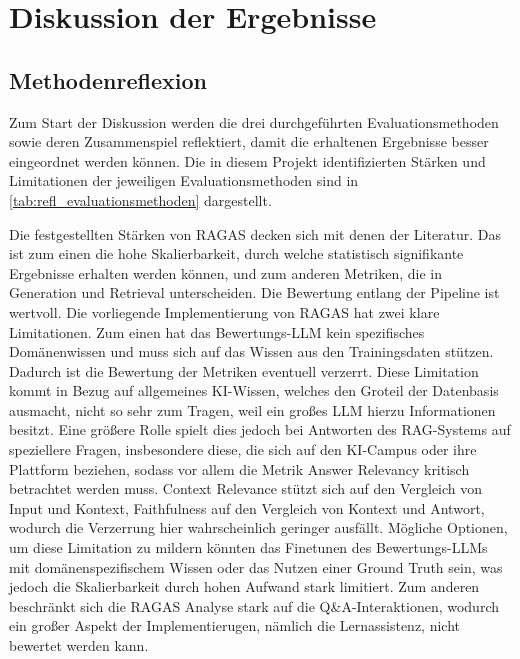 \chapter{Diskussion der Ergebnisse}
\label{sec:diskussion}
\section{Methodenreflexion}
\label{sec:methodrefl}
Zum Start der Diskussion werden die drei durchgeführten Evaluationsmethoden sowie deren Zusammenspiel reflektiert, damit die erhaltenen Ergebnisse besser eingeordnet werden können. Die in diesem Projekt identifizierten Stärken und Limitationen der jeweiligen Evaluationsmethoden sind in \autoref{tab:refl_evaluationsmethoden} dargestellt.

Die festgestellten Stärken von RAGAS decken sich mit denen der Literatur. Das ist zum einen die hohe Skalierbarkeit, durch welche statistisch signifikante Ergebnisse erhalten werden können, und zum anderen Metriken, die in Generation und Retrieval unterscheiden. Die Bewertung entlang der Pipeline ist wertvoll. Die vorliegende Implementierung von RAGAS hat zwei klare Limitationen. Zum einen hat das Bewertungs-LLM kein spezifisches Domänenwissen und muss sich auf das Wissen aus den Trainingsdaten stützen. Dadurch ist die Bewertung der Metriken eventuell verzerrt. Diese Limitation kommt in Bezug auf allgemeines KI-Wissen, welches den Groteil der Datenbasis ausmacht, nicht so sehr zum Tragen, weil ein großes LLM hierzu Informationen besitzt. Eine größere Rolle spielt dies jedoch bei Antworten des RAG-Systems auf speziellere Fragen, insbesondere diese, die sich auf den KI-Campus oder ihre Plattform beziehen, sodass vor allem die Metrik Answer Relevancy kritisch betrachtet werden muss. Context Relevance stützt sich auf den Vergleich von Input und Kontext, Faithfulness auf den Vergleich von Kontext und Antwort, wodurch die Verzerrung hier wahrscheinlich geringer ausfällt. Mögliche Optionen, um diese Limitation zu mildern könnten das Finetunen des Bewertungs-LLMs mit domänenspezifischem Wissen oder das Nutzen einer Ground Truth sein, was jedoch die Skalierbarkeit durch hohen Aufwand stark limitiert. Zum anderen beschränkt sich die RAGAS Analyse stark auf die Q\&A-Interaktionen, wodurch ein großer Aspekt der Implementierugen, nämlich die Lernassistenz, nicht bewertet werden kann.

